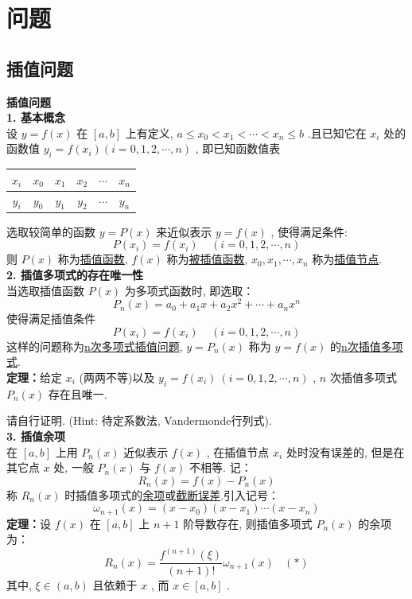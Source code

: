 \documentclass[11pt,a4paper,openany,oneside]{book}
\begin{document}
\chapter{问题}
\section{插值问题}
\textbf{\large{插值问题}} \\
\textbf{1. 基本概念} \\ 
设 $ y=f(x) $ 在 $ [a,b] $ 上有定义,  $ a \leq x_0 < x_1 < \cdots < x_n \leq b $ .且已知它在 $ x_i $ 处的函数值 $ y_i = f(x_i) (i=0, 1, 2, \cdots, n) $ , 即已知函数值表
\begin{center}
	\begin{tabular}{c|ccccc}
		 $ x_i $  &  $ x_0 $  &  $ x_1 $  &  $ x_2 $  &  $ \cdots $  &  $ x_n $  \\
		\hline
		 $ y_i $  &  $ y_0 $  &  $ y_1 $  &  $ y_2 $  &  $ \cdots $  &  $ y_n $  \\
	\end{tabular}
\end{center}
选取较简单的函数 $ y = P(x) $ 来近似表示 $ y = f(x) $ , 使得满足条件:
 $$  P(x_i) = f(x_i) \ \ \ \ \ (i = 0, 1, 2, \cdots, n)  $$ 
则 $ P(x) $ 称为\underline{插值函数},  $ f(x) $ 称为\underline{被插值函数},  $ x_0, x_1, \cdots, x_n $ 称为\underline{插值节点}. \\

\textbf{2. 插值多项式的存在唯一性}  \\
当选取插值函数 $ P(x) $ 为多项式函数时, 即选取：
 $$  P_n(x) = a_0 + a_1x + a_2x^2 + \cdots + a_nx^n  $$ 
使得满足插值条件
 $$  P(x_i) = f(x_i) \ \ \ \ \ (i = 0, 1, 2, \cdots, n)  $$ 
这样的问题称为\underline{n次多项式插值问题},  $ y = P_n(x) $ 称为 $ y=f(x) $ 的\underline{n次插值多项式}. \\


	\textbf{定理：}给定 $ x_i $ (两两不等)以及 $ y_i = f(x_i)\ (i = 0, 1, 2, \cdots, n) $ ,  $ n $ 次插值多项式 $ P_n(x) $ 存在且唯一. 
	


请自行证明. (Hint: 待定系数法, Vandermonde行列式). \\


	\textbf{3. 插值余项} \\ 
	在 $ [a,b] $ 上用 $ P_n(x) $ 近似表示 $ f(x) $ , 在插值节点 $ x_i $ 处时没有误差的, 但是在其它点 $ x $ 处, 一般 $ P_n(x) $ 与 $ f(x) $ 不相等. 记：
	 $$  R_n(x) = f(x) - P_n(x)  $$ 
	称 $ R_n(x) $ 时插值多项式的\underline{余项}或\underline{截断误差}.引入记号：
	 $$  \omega_{n+1}(x) = (x-x_0)(x-x_1)\cdots(x-x_n)  $$ 
	\textbf{定理：}设 $ f(x) $ 在 $ [a,b] $ 上 $ n+1 $ 阶导数存在, 则插值多项式 $ P_n(x) $ 的余项为：
	 $$  R_n(x) = \dfrac{f^{(n+1)}(\xi)}{(n+1)!}\omega_{n+1}(x) \ \ \ \ (*)  $$ 
	\hspace{2.3em} 其中,  $ \xi \in (a,b) $ 且依赖于 $ x $ , 而 $ x \in [a,b] $ . \\
	
\end{document}
